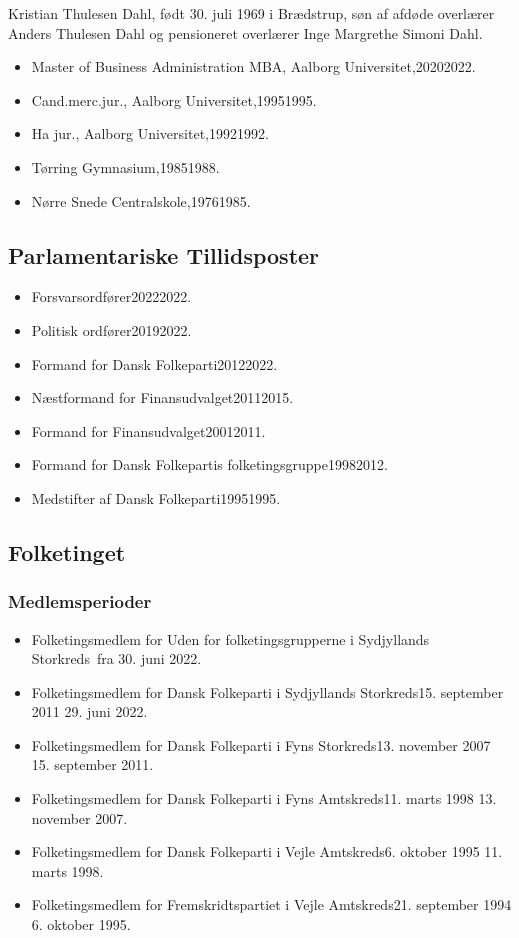 \documentclass[11pt, a4paper]{awesome-cv}
\begin{document}
\makecvheader[R]
\makelettertitle
\begin{cvletter}
Kristian  Thulesen Dahl, født 30. juli 1969 i Brædstrup, søn af afdøde overlærer Anders Thulesen Dahl og pensioneret overlærer Inge Margrethe Simoni Dahl.

\begin{itemize}
\item Master of Business Administration MBA, Aalborg Universitet,20202022.
\item Cand.merc.jur., Aalborg Universitet,19951995.
\item Ha jur., Aalborg Universitet,19921992.
\item Tørring Gymnasium,19851988.
\item Nørre Snede Centralskole,19761985.
\end{itemize}
\subsection*{Parlamentariske Tillidsposter}
\begin{itemize}
\item Forsvarsordfører20222022.
\item Politisk ordfører20192022.
\item Formand for Dansk Folkeparti20122022.
\item Næstformand for Finansudvalget20112015.
\item Formand for Finansudvalget20012011.
\item Formand for Dansk Folkepartis folketingsgruppe19982012.
\item Medstifter af Dansk Folkeparti19951995.
\end{itemize}
\subsection*{Folketinget}
\subsubsection*{Medlemsperioder}
\begin{itemize}
\item Folketingsmedlem for Uden for folketingsgrupperne i Sydjyllands Storkreds fra 30. juni 2022.
\item Folketingsmedlem for Dansk Folkeparti i Sydjyllands Storkreds15. september 2011  29. juni 2022.
\item Folketingsmedlem for Dansk Folkeparti i Fyns Storkreds13. november 2007  15. september 2011.
\item Folketingsmedlem for Dansk Folkeparti i Fyns Amtskreds11. marts 1998  13. november 2007.
\item Folketingsmedlem for Dansk Folkeparti i Vejle Amtskreds6. oktober 1995  11. marts 1998.
\item Folketingsmedlem for Fremskridtspartiet i Vejle Amtskreds21. september 1994  6. oktober 1995.
\end{itemize}

\end{cvletter}
\end{document}
